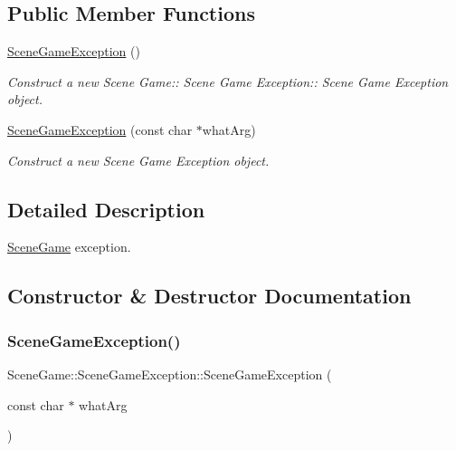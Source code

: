 \subsection*{Public Member Functions}
\begin{DoxyCompactItemize}
\item 
\mbox{\label{class_scene_game_1_1_scene_game_exception_aae98bdad0de1b0c9245edba103b12ca6}} 
\hyperlink{class_scene_game_1_1_scene_game_exception_aae98bdad0de1b0c9245edba103b12ca6}{Scene\+Game\+Exception} ()
\begin{DoxyCompactList}\small\item\em Construct a new Scene Game\+:\+: Scene Game Exception\+:\+: Scene Game Exception object. \end{DoxyCompactList}\item 
\hyperlink{class_scene_game_1_1_scene_game_exception_aa51d793f4e76b28a3ab2b6d6d39cbb41}{Scene\+Game\+Exception} (const char $\ast$what\+Arg)
\begin{DoxyCompactList}\small\item\em Construct a new Scene Game Exception object. \end{DoxyCompactList}\end{DoxyCompactItemize}


\subsection{Detailed Description}
\hyperlink{class_scene_game}{Scene\+Game} exception. 

\subsection{Constructor \& Destructor Documentation}
\mbox{\label{class_scene_game_1_1_scene_game_exception_aa51d793f4e76b28a3ab2b6d6d39cbb41}} 
\subsubsection{\texorpdfstring{Scene\+Game\+Exception()}{SceneGameException()}}
{\footnotesize\ttfamily Scene\+Game\+::\+Scene\+Game\+Exception\+::\+Scene\+Game\+Exception (\begin{DoxyParamCaption}\item[{const char $\ast$}]{what\+Arg }\end{DoxyParamCaption})\hspace{0.3cm}{\ttfamily [explicit]}}



